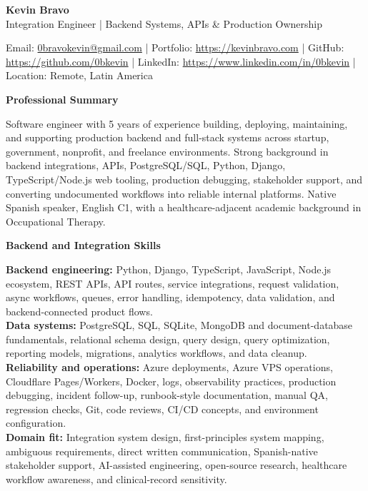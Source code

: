 \documentclass[10pt]{article}
\begin{document}
\raggedright

\begin{center}
    {\LARGE \textbf{Kevin Bravo}}\\
    Integration Engineer | Backend Systems, APIs \& Production Ownership \\
    \hrulefill
\end{center}

\begin{center}
    Email: \href{mailto:0bravokevin@gmail.com}{0bravokevin@gmail.com}
    | Portfolio: \href{https://kevinbravo.com}{https://kevinbravo.com}
    | GitHub: \href{https://github.com/0bkevin}{https://github.com/0bkevin}
    | LinkedIn: \href{https://www.linkedin.com/in/0bkevin/}{https://www.linkedin.com/in/0bkevin}
    | Location: Remote, Latin America
\end{center}
\fontsize{9.35}{10.35}\selectfont

\vspace{1pt}
\begin{center}
    \textbf{Professional Summary}
\end{center}
\vspace{-7pt}
Software engineer with 5 years of experience building, deploying, maintaining, and supporting production backend and full-stack systems across startup, government, nonprofit, and freelance environments. Strong background in backend integrations, APIs, PostgreSQL/SQL, Python, Django, TypeScript/Node.js web tooling, production debugging, stakeholder support, and converting undocumented workflows into reliable internal platforms. Native Spanish speaker, English C1, with a healthcare-adjacent academic background in Occupational Therapy.

\vspace{3pt}
\begin{center}
    \textbf{Backend and Integration Skills}
\end{center}
\vspace{-7pt}
\textbf{Backend engineering:} Python, Django, TypeScript, JavaScript, Node.js ecosystem, REST APIs, API routes, service integrations, request validation, async workflows, queues, error handling, idempotency, data validation, and backend-connected product flows. \\
\textbf{Data systems:} PostgreSQL, SQL, SQLite, MongoDB and document-database fundamentals, relational schema design, query design, query optimization, reporting models, migrations, analytics workflows, and data cleanup. \\
\textbf{Reliability and operations:} Azure deployments, Azure VPS operations, Cloudflare Pages/Workers, Docker, logs, observability practices, production debugging, incident follow-up, runbook-style documentation, manual QA, regression checks, Git, code reviews, CI/CD concepts, and environment configuration. \\
\textbf{Domain fit:} Integration system design, first-principles system mapping, ambiguous requirements, direct written communication, Spanish-native stakeholder support, AI-assisted engineering, open-source research, healthcare workflow awareness, and clinical-record sensitivity.
\end{document}
